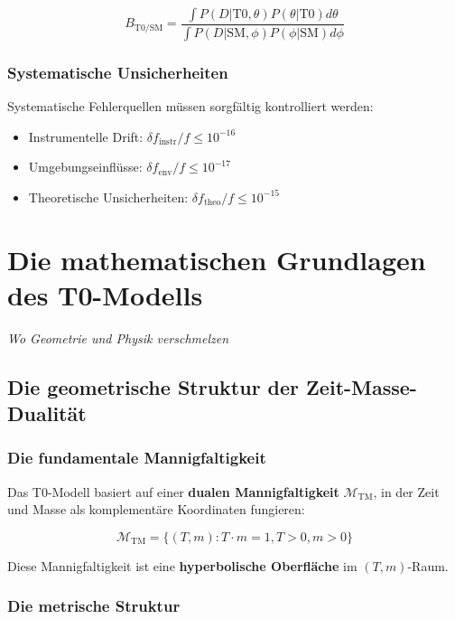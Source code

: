 \documentclass[12pt,a4paper]{report}
\begin{document}
	\begin{equation}
		B_{\text{T0/SM}} = \frac{\int P(D|\text{T0},\theta)P(\theta|\text{T0})d\theta}{\int P(D|\text{SM},\phi)P(\phi|\text{SM})d\phi}
	\end{equation}
	
	\subsection{Systematische Unsicherheiten}
	
	Systematische Fehlerquellen müssen sorgfältig kontrolliert werden:
	
	\begin{itemize}
		\item Instrumentelle Drift: $\delta f_{\text{instr}}/f \leq 10^{-16}$
		\item Umgebungseinflüsse: $\delta f_{\text{env}}/f \leq 10^{-17}$
		\item Theoretische Unsicherheiten: $\delta f_{\text{theo}}/f \leq 10^{-15}$
	\end{itemize}
	
	\chapter{Die mathematischen Grundlagen des T0-Modells}
	\textit{Wo Geometrie und Physik verschmelzen}
	
	\section{Die geometrische Struktur der Zeit-Masse-Dualität}
	
	\subsection{Die fundamentale Mannigfaltigkeit}
	
	Das T0-Modell basiert auf einer \textbf{dualen Mannigfaltigkeit} $\mathcal{M}_{\text{TM}}$, in der Zeit und Masse als komplementäre Koordinaten fungieren:
	
	\begin{equation}
		\mathcal{M}_{\text{TM}} = \{(T,m) : T \cdot m = 1, T > 0, m > 0\}
	\end{equation}
	
	Diese Mannigfaltigkeit ist eine \textbf{hyperbolische Oberfläche} im $(T,m)$-Raum.
	
	\subsection{Die metrische Struktur}
	
\end{document}
